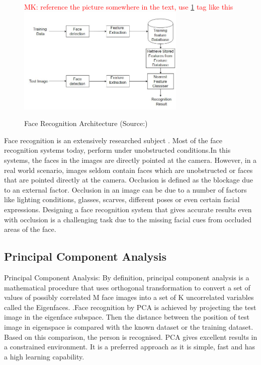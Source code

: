 \documentclass[conference]{IEEEtran}
\newcommand{\MK}[1]{\textcolor{red}{MK: #1}}  %
\begin{document}
\begin{figure}[h!]
\MK{reference the picture somewhere in the text, use \ref{fig 1: face recognition architecture} tag like this}
 \centering
 \includegraphics[width = 8cm]{Face_Recognition_Architecture.JPG}
 \caption{ Face Recognition Architecture (Source:\cite{makwana_makwana_2016})}
 \label{fig 1: face recognition architecture}
\end{figure}

Face recognition is an extensively researched subject\cite{zhao2003face} \cite{abate20072d}.  Most of the face recognition systems today, perform under unobstructed conditions\cite{phillips2005overview}.In this systems, the faces in the images are directly pointed at the camera. However, in a real world scenario, images seldom contain faces which are unobstructed or  faces that are pointed directly at the camera. Occlusion is defined as the blockage due to an external factor. Occlusion in an image can be due to a number of factors like lighting conditions, glasses, scarves, different poses or even certain facial expressions. Designing a face recognition system that gives accurate results even with occlusion is a challenging task due to the missing facial cues from occluded areas of the face.

\subsection{Principal Component Analysis}
\label{subsec: 1a.Principal Component Analysis}
Principal Component Analysis: By definition, principal component analysis is a mathematical procedure that uses orthogonal transformation to convert a set of values of possibly correlated M face images into a set of K uncorrelated variables called the Eigenfaces.
\cite{turk1991face}.Face recognition by PCA is achieved by projecting the test image in the eigenface subspace. Then the distance between the position of test image in eigenspace is compared with the known dataset or the training dataset. Based on this comparison, the person is recognised. PCA gives excellent results in a constrained environment. It is a preferred approach as it is simple, fast and has a high learning capability.
\end{document}
